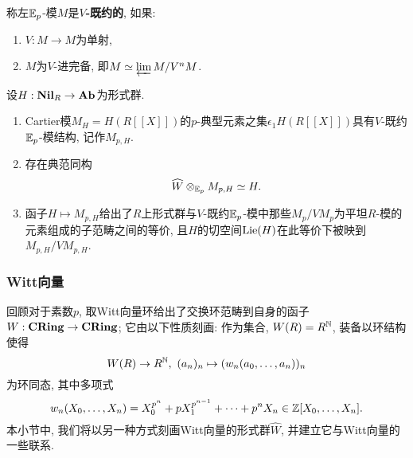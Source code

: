 \begin{definition}
    称左$\mathbb{E}_p$-模$M$是\textbf{$V$-既约的}, 如果:
    \begin{enumerate}
        \item $V : M\to M$为单射,
        \item $M$为$V$-进完备, 即$M\simeq\varprojlim M/V^nM$.
    \end{enumerate}
\end{definition}


\begin{theorem}\label{formal group equiv V-reduced Cartier module - local}
    设$H:\mathbf{Nil}_R\to\mathbf{Ab}$为形式群.
    \begin{enumerate}
        \item Cartier模$M_H = H(R[[X]])$的$p$-典型元素之集$\epsilon_1H(R[[X]])$具有$V$-既约$\mathbb{E}_p$-模结构,
        记作$M_{p, H}$.
        \item 存在典范同构\[\widehat{W}\otimes_{\mathbb{E}_p} M_{p, H}\simeq H.\]
        \item 函子$H\mapsto M_{p,H}$给出了$R$上形式群与$V$-既约$\mathbb{E}_p$-模中那些$M_p/VM_p$为平坦$R$-模的元素组成的子范畴之间的等价,
        且$H$的切空间$\operatorname{Lie}(H)$在此等价下被映到$M_{p, H}/VM_{p, H}$.
    \end{enumerate}
\end{theorem}

\subsubsection{Witt向量}
回顾对于素数$p$, 取Witt向量环给出了交换环范畴到自身的函子$W : \mathbf{CRing}\to\mathbf{CRing}$;
它由以下性质刻画: 作为集合, $W(R) = R^{\mathbb{N}}$, 装备以环结构使得\[W(R)\to R^{\mathbb{N}},\ (a_n)_n\mapsto (w_n(a_0, \dots, a_n))_n\]
为环同态, 其中多项式\[w_n(X_0, \dots, X_n) = X_0^{p^n} + pX_1^{p^{n-1}} + \dots + p^nX_n\in \mathbb{Z}[X_0, \dots, X_n].\]
本小节中, 我们将以另一种方式刻画Witt向量的形式群$\hat{W}$, 并建立它与Witt向量的一些联系.

